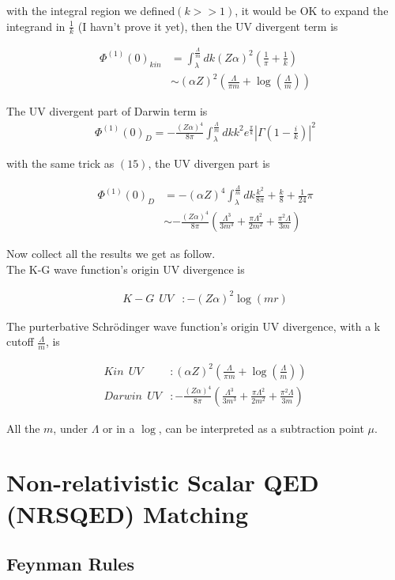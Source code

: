 \documentclass{article}
\begin{document}
with the integral region we defined$(k>>1)$, it would be OK to expand the integrand in $\frac{1}{k}$ (I havn't prove it yet), then the UV divergent term is

\begin{align}
\Phi^{(1)}(0)_{kin}&=\int_\lambda^\frac{\Lambda}{m}dk(Z\alpha)^2(\frac{1}{\pi}+\frac{1}{k})\\
&\sim(\alpha Z)^2(\frac{\Lambda}{\pi m}+\log(\frac{\Lambda}{m}))
\end{align}

The UV divergent part of Darwin term is
\begin{align}
\Phi^{(1)}(0)_D=-\frac{(Z\alpha)^4}{8\pi}\int_\lambda^\frac{\Lambda}{m}dkk^2e^\frac{\pi}{k}|\Gamma(1-\frac{i}{k})|^2
\end{align}

with the same trick as $(15)$, the UV divergen part is

\begin{align}
\Phi^{(1)}(0)_{D}&=-(\alpha Z)^4\int_\lambda^\frac{\Lambda}{m}dk\frac{k^2}{8\pi}+\frac{k}{8}+\frac{1}{24}\pi\\
&\sim -\frac{(Z\alpha)^4}{8\pi}(\frac{\Lambda^3}{3m^3}+\frac{\pi\Lambda^2}{2m^2}+\frac{\pi^2\Lambda}{3m})
\end{align}

Now collect all the results we get as follow.\\
The K-G wave function's origin UV divergence is

\begin{align}
K-G\ \ UV&:-(Z\alpha)^2\log(m r)
\end{align}

The purterbative Schr\"odinger wave function's origin UV divergence, with a k cutoff $\frac{\Lambda}{m}$, is

\begin{align}
Kin\ \  UV&:(\alpha Z)^2(\frac{\Lambda}{\pi m}+\log(\frac{\Lambda}{m}))\\
Darwin\ \  UV&:-\frac{(Z\alpha)^4}{8\pi}(\frac{\Lambda^3}{3m^3}+\frac{\pi\Lambda^2}{2m^2}+\frac{\pi^2\Lambda}{3m})
\end{align}

All the $m$, under $\Lambda$ or in a $\log$, can be interpreted as a subtraction point $\mu$.

\section{Non-relativistic Scalar QED (NRSQED) Matching}
\subsection{Feynman Rules}
\end{document}

